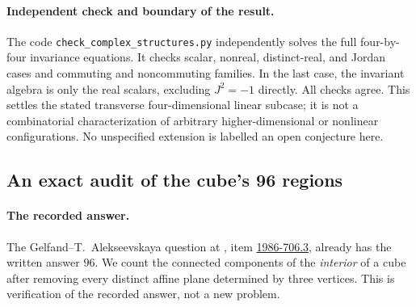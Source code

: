 \paragraph{Independent check and boundary of the result.}
The code \texttt{check\_\allowbreak{}complex\_\allowbreak{}structures.py} independently solves
the full four-by-four invariance equations. It checks scalar,
nonreal, distinct-real, and Jordan cases and commuting and
noncommuting families. In the last case, the invariant algebra is
only the real scalars, excluding \(J^2=-1\) directly. All checks
agree. This settles the stated transverse four-dimensional linear
subcase; it is not a combinatorial characterization of arbitrary
higher-dimensional or nonlinear configurations. No unspecified
extension is labelled an open conjecture here.

\subsection{An exact audit of the cube's 96 regions}
\label{dev:cube}

\paragraph{The recorded answer.}
The Gelfand--T.~Alekseevskaya question at ,
item \hyperref[item:1986-706.3]{1986-706.3}, already has the written
answer \(96\). We count the connected components of the
\emph{interior} of a cube after removing every distinct affine
plane determined by three vertices. This is verification of the
recorded answer, not a new problem.

